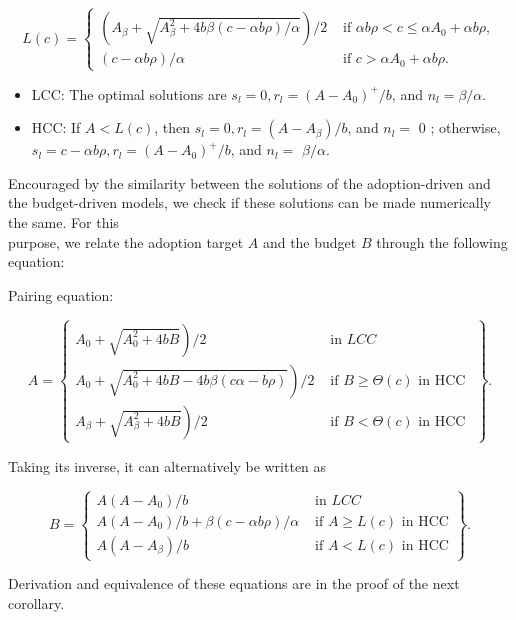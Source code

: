 \documentclass[10pt]{article}
\begin{document}
\[
L(c)= \begin{cases}\left(A_{\beta}+\sqrt{A_{\beta}^{2}+4 b \beta(c-\alpha b \rho) / \alpha}\right) / 2 & \text { if } \alpha b \rho<c \leq \alpha A_{0}+\alpha b \rho,  \tag{12}\\ (c-\alpha b \rho) / \alpha & \text { if } c>\alpha A_{0}+\alpha b \rho .\end{cases}
\]

\begin{itemize}
  \item LCC: The optimal solutions are $s_{l}=0, r_{l}=\left(A-A_{0}\right)^{+} / b$, and $n_{l}=\beta / \alpha$.
  \item HCC: If $A<L(c)$, then $s_{l}=0, r_{l}=\left(A-A_{\beta}\right) / b$, and $n_{l}=$ 0 ; otherwise, $s_{l}=c-\alpha b \rho, r_{l}=\left(A-A_{0}\right)^{+} / b$, and $n_{l}=$ $\beta / \alpha$.
\end{itemize}

Encouraged by the similarity between the solutions of the adoption-driven and the budget-driven models, we check if these solutions can be made numerically the same. For this\\
purpose, we relate the adoption target $A$ and the budget $B$ through the following equation:

Pairing equation:

\[
A=\left\{\begin{array}{cl}
\left.A_{0}+\sqrt{A_{0}^{2}+4 b B}\right) / 2 & \text { in } L C C  \tag{13}\\
\left.A_{0}+\sqrt{A_{0}^{2}+4 b B-4 b \beta(c \alpha-b \rho)}\right) / 2 & \text { if } B \geq \Theta(c) \text { in HCC } \\
\left.A_{\beta}+\sqrt{A_{\beta}^{2}+4 b B}\right) / 2 & \text { if } B<\Theta(c) \text { in HCC }
\end{array}\right\} .
\]

Taking its inverse, it can alternatively be written as

\[
B=\left\{\begin{align*}
A\left(A-A_{0}\right) / b & \text { in } L C C  \tag{14}\\
A\left(A-A_{0}\right) / b+\beta(c-\alpha b \rho) / \alpha & \text { if } A \geq L(c) \text { in } \mathrm{HCC} \\
A\left(A-A_{\beta}\right) / b & \text { if } A<L(c) \text { in } \mathrm{HCC}
\end{align*}\right\} .
\]

Derivation and equivalence of these equations are in the proof of the next corollary.
\end{document}
